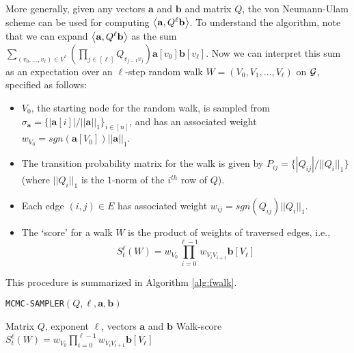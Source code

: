 More generally, given any vectors $\mathbf{a}$ and $\mathbf{b}$ and matrix $Q$, the von Neumann-Ulam scheme can be used for computing $\left< \mathbf{a}, Q^{\ell}\mathbf{b} \right>$.
To understand the algorithm, note that we can expand $\left< \mathbf{a}, Q^{\ell}\mathbf{b} \right>$ as the sum $\sum_{(v_0,\ldots, v_{\ell}) \in V^{\ell}}\left(\prod_{j \in [{\ell}]} Q_{v_{j-1}v_{j}} \right) \mathbf{a}[v_0] \mathbf{b}[v_{\ell}]$. 
Now we can interpret this sum as an expectation over an ${\ell}$-step random walk $W = (V_0,V_1,\ldots,V_{\ell})$ on ${\mathcal{G}}$, specified as follows:
\begin{itemize}
\item $V_0$, the starting node for the random walk, is sampled from $\sigma_{\mathbf{a}} = \{|\mathbf{a}[i]|/||\mathbf{a}||_1\}_{i\in [n]}$, and has an associated weight $w_{V_0} = sgn(\mathbf{a}[V_0])||\mathbf{a}||_1$.
\item The transition probability matrix for the walk is given by $P_{ij} = \{|Q_{ij}|/||Q_i||_1\}$ (where $||Q_i||_1$ is the $1$-norm of the $i^{th}$ row of $Q$).
\item Each edge $(i,j)\in E$ has associated weight $w_{ij} = sgn(Q_{ij})||Q_i||_1$. 
\item The `score' for a walk $W$ is the product of weights of traversed edges, i.e.,
$$S_t^{\ell}(W) = w_{V_0}\prod_{i=0}^{{\ell}-1}w_{V_iV_{i+1}}\mathbf{b}[V_{\ell}]$$
\end{itemize}
This procedure is summarized in Algorithm \ref{alg:fwalk}. 

\begin{algorithm}[ht]
\caption{\texttt{MCMC-SAMPLER}$(Q, {\ell}, \mathbf{a}, \mathbf{b})$}
\label{alg:fwalk}
\begin{algorithmic}[1]
\REQUIRE Matrix $Q$, exponent ${\ell}$, vectors $\mathbf{a}$ and $\mathbf{b}$
\RETURN Walk-score $S_{t}^{\ell}(W) = w_{V_0}\prod_{i=0}^{{\ell}-1}w_{V_iV_{i+1}}\mathbf{b}[V_{\ell}]$
\end{algorithmic}
\end{algorithm} 

